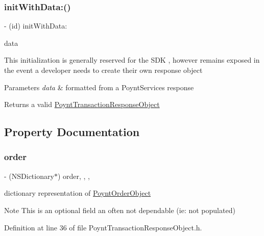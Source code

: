 \subsubsection{\texorpdfstring{init\+With\+Data\+:()}{initWithData:()}}
{\footnotesize\ttfamily -\/ (id) init\+With\+Data\+: \begin{DoxyParamCaption}\item[{(N\+S\+Data $\ast$)}]{data }\end{DoxyParamCaption}}

This initialization is generally reserved for the S\+DK , however remains exposed in the event a developer needs to create their own response object


\begin{DoxyParams}{Parameters}
{\em data} & formatted from a Poynt\+Services response \\
\hline
\end{DoxyParams}
\begin{DoxyReturn}{Returns}
a valid \hyperlink{interface_poynt_transaction_response_object}{Poynt\+Transaction\+Response\+Object} 
\end{DoxyReturn}


\subsection{Property Documentation}
\hypertarget{interface_poynt_transaction_response_object_a14f67be3c2e0d0a1dfbaf225c2fcef4b}{}\label{interface_poynt_transaction_response_object_a14f67be3c2e0d0a1dfbaf225c2fcef4b} 
\subsubsection{\texorpdfstring{order}{order}}
{\footnotesize\ttfamily -\/ (N\+S\+Dictionary$\ast$) order\hspace{0.3cm}{\ttfamily [read]}, {\ttfamily [write]}, {\ttfamily [nonatomic]}, {\ttfamily [strong]}}

dictionary representation of \hyperlink{interface_poynt_order_object}{Poynt\+Order\+Object} \begin{DoxyNote}{Note}
This is an optional field an often not dependable (ie\+: not populated) 
\end{DoxyNote}


Definition at line 36 of file Poynt\+Transaction\+Response\+Object.\+h.

